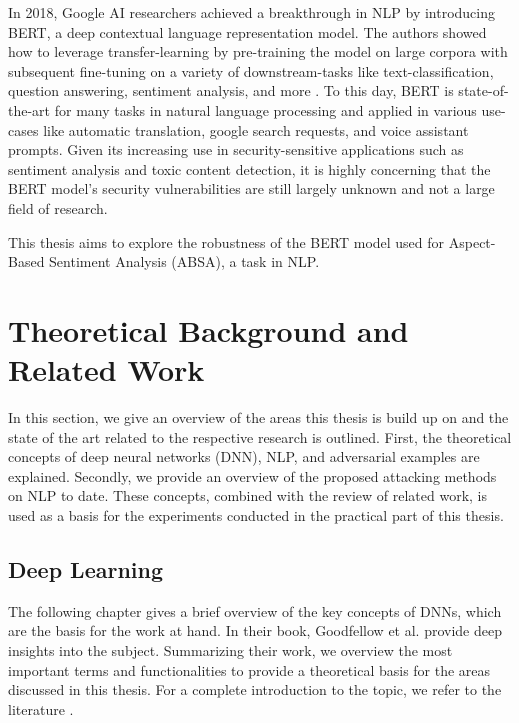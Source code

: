 In 2018, Google AI researchers achieved a breakthrough in NLP by introducing BERT, a deep contextual language representation model. The authors showed how to leverage transfer-learning by pre-training the model on large corpora with subsequent fine-tuning on a variety of downstream-tasks like text-classification, question answering, sentiment analysis, and more \cite{devlin2018bert}. To this day, BERT is state-of-the-art for many tasks in natural language processing and applied in various use-cases like automatic translation, google search requests, and voice assistant prompts. 
Given its increasing use in security-sensitive applications such as sentiment analysis and toxic content detection, it is highly concerning that the BERT model's security vulnerabilities are still largely unknown and not a large field of research.

This thesis aims to explore the robustness of the BERT model used for Aspect-Based Sentiment Analysis (ABSA), a task in NLP. 



\section{Theoretical Background and Related Work}

In this section, we give an overview of the areas this thesis is build up on and the state of the art related to the respective research is outlined. First, the theoretical concepts of deep neural networks (DNN), NLP, and adversarial examples are explained. Secondly, we provide an overview of the proposed attacking methods on NLP to date. These concepts, combined with the review of related work, is used as a basis for the experiments conducted in the practical part of this thesis. 

\subsection{Deep Learning}
The following chapter gives a brief overview of the key concepts of DNNs, which are the basis for the work at hand. In their book, Goodfellow et al. provide deep insights into the subject. Summarizing their work, we overview the most important terms and functionalities to provide a theoretical basis for the areas discussed in this thesis. For a complete introduction to the topic, we refer to the literature \cite{bengio2017deep}. 

